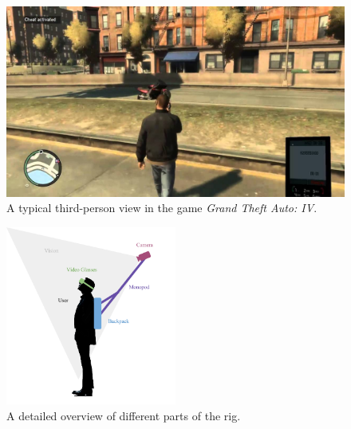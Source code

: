 \documentclass[runningheads,a4paper,oribibl]{llncs}
\begin{document}
\begin{figure}
   \centering
   \includegraphics[width=\textwidth]{ExternalMaterial/GTA}
   \caption{A typical third-person view in the game \emph{Grand Theft Auto: IV}. \label{fig:GTAIV}}
\end{figure}

\begin{figure}
   \centering
   \includegraphics[width=0.5\textwidth]{ExternalMaterial/Rig}
   \caption{A detailed overview of different parts of the rig. \label{fig:RigDesign}}
\end{figure}










\end{document}
